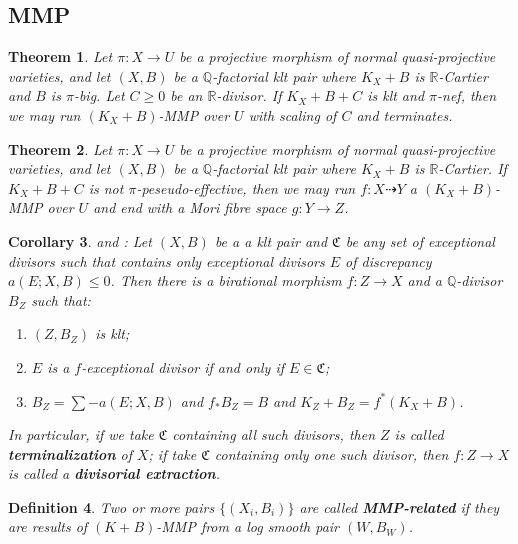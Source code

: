 \documentclass{article}
\newtheorem{defn}{Definition}[subsection]
\newtheorem{thm}[defn]{Theorem}
\newtheorem{cor}[defn]{Corollary}
\newtheorem{rmk}[defn]{Remark}
\begin{document}
\subsection{MMP}
\begin{thm}
\cite[Corollary 1.4.2]{birkarExistenceMinimalModels2009}Let $ \pi:X\to U $ be a projective morphism of normal quasi-projective varieties, and let $(X,B)$ be a $\mathbb{Q}$-factorial klt pair where $K_{X}+B$ is $\mathbb{R}$-Cartier and $B$ is $\pi$-big. Let $C\geqslant0$ be an $\mathbb{R}$-divisor. If $K_{X}+B+C$ is klt and  $\pi$-nef, then we may run $(K_{X}+B)$-MMP over $U$  with scaling of $C$ and  terminates.
\end{thm}
\begin{thm}\label{notpseudoeffmfs}
  \cite[Corollary 1.3.3]{birkarExistenceMinimalModels2009}Let $ \pi:X\to U $ be a projective morphism of normal quasi-projective varieties, and let $(X,B)$ be a $\mathbb{Q}$-factorial klt pair where $K_{X}+B$ is $\mathbb{R}$-Cartier.  If $K_{X}+B+C$ is  not $\pi$-peseudo-effective, then we may run $f:X\dashrightarrow Y$ a $(K_{X}+B)$-MMP over   $U$ and end with a Mori fibre space $g:Y\to Z$.
\end{thm}

\begin{cor}\label{extraction}
  \cite[Corollary 13.7]{haconMinimalModelProgram2012} and \cite[Corollary 1.4.3]{birkarExistenceMinimalModels2009}: Let $ (X,B) $ be a a klt pair and $\mathfrak{C}$ be any set of exceptional divisors such that  contains only exceptional divisors $ E $ of discrepancy $ a(E;X,B)\leqslant 0 $. Then there is a birational morphism $ f:Z\to X $ and a $ \mathbb{Q} $-divisor $ B_Z $ such that:
  \begin{enumerate}
    \item $ (Z,B_Z) $ is klt;
    \item $ E $ is a $f$-exceptional divisor if and only if $ E\in \mathfrak{C} $;
    \item $ B_Z=\sum-a(E;X,B) $ and $ f_*B_Z=B $ and $ K_Z+B_Z=f^*(K_X+B) $.
  \end{enumerate} 
  In particular, if we take $\mathfrak{C}$ containing all such divisors, then $ Z $ is called \textbf{terminalization} of $ X $; if take $\mathfrak{C}$ containing only one such divisor, then $ f:Z\to X $ is called a \textbf{divisorial extraction}.    
\end{cor}

\begin{defn}
  \cite[Definition 3.3]{brunoLogSarkisovProgram1995}
  Two or more pairs $ \{(X_i,B_i)\} $ are called \textbf{MMP-related} if they are results of $ (K+B) $-MMP from a log smooth pair $(W,B_{W})$.
\end{defn}
  
\end{document}

